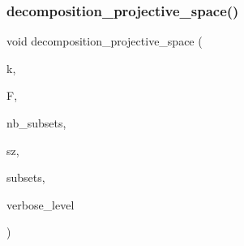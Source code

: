 \subsubsection{\texorpdfstring{decomposition\+\_\+projective\+\_\+space()}{decomposition\_projective\_space()}}
{\footnotesize\ttfamily void decomposition\+\_\+projective\+\_\+space (\begin{DoxyParamCaption}\item[{\mbox{\hyperlink{galois_8h_a09fddde158a3a20bd2dcadb609de11dc}{I\+NT}}}]{k,  }\item[{\mbox{\hyperlink{classfinite__field}{finite\+\_\+field}} $\ast$}]{F,  }\item[{\mbox{\hyperlink{galois_8h_a09fddde158a3a20bd2dcadb609de11dc}{I\+NT}}}]{nb\+\_\+subsets,  }\item[{\mbox{\hyperlink{galois_8h_a09fddde158a3a20bd2dcadb609de11dc}{I\+NT}} $\ast$}]{sz,  }\item[{\mbox{\hyperlink{galois_8h_a09fddde158a3a20bd2dcadb609de11dc}{I\+NT}} $\ast$$\ast$}]{subsets,  }\item[{\mbox{\hyperlink{galois_8h_a09fddde158a3a20bd2dcadb609de11dc}{I\+NT}}}]{verbose\+\_\+level }\end{DoxyParamCaption})}

